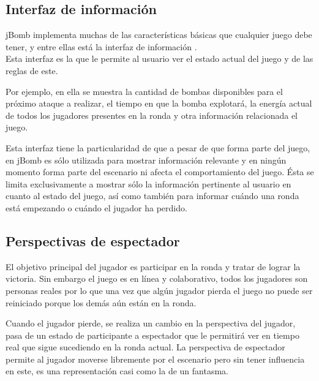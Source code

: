 \documentclass[a4paper,12pt,openany,oneside]{book}
\begin{document}
\subsection{Interfaz de información}
jBomb implementa muchas de las características básicas que cualquier juego debe tener, y entre ellas está la interfaz de información \cite{BEGINNERS}.\\
Esta interfaz es la que le permite al usuario ver el estado actual del juego y de las reglas de este.

Por ejemplo, en ella se muestra la cantidad de bombas disponibles para el próximo ataque a realizar, el tiempo en que la bomba explotará, la energía actual de todos los jugadores presentes en la ronda y otra información relacionada el juego.

Esta interfaz tiene la particularidad de que a pesar de que forma parte del juego, en jBomb es sólo utilizada para mostrar información relevante y en ningún momento forma parte del escenario ni afecta el comportamiento del juego. Ésta se limita exclusivamente a mostrar sólo la información pertinente al usuario en cuanto al estado del juego, así como también para informar cuándo una ronda está empezando o cuándo el jugador ha perdido.
\subsection{Perspectivas de espectador}
El objetivo principal del jugador es participar en la ronda y tratar de lograr la victoria. Sin embargo el juego es en línea y colaborativo, todos los jugadores son personas reales por lo que una vez que algún jugador pierda el juego no puede ser reiniciado porque los demás aún están en la ronda.

Cuando el jugador pierde, se realiza un cambio en la perspectiva del jugador, pasa de un estado de participante a espectador que le permitirá ver en tiempo real que sigue sucediendo en la ronda actual. La perspectiva de espectador permite al jugador moverse libremente por el escenario pero sin tener influencia en este, es una representación casi como la de un fantasma.
\end{document}
